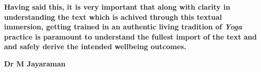 \textbf{Having said this, it is very important that along with clarity in understanding the text which is achived through this textual immersion, getting trained in an authentic living tradition of \textit{Yoga} practice is paramount to understand the fullest import of the text and and safely derive the intended wellbeing outcomes.}
\vspace{1cm}

\begin{flushright}
\textbf{Dr M Jayaraman}
\end{flushright}

